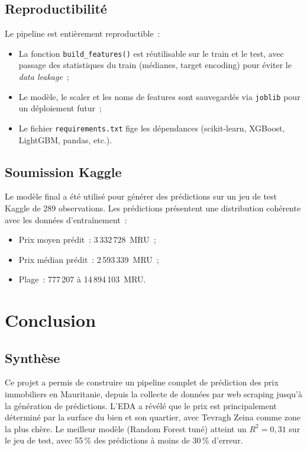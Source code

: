 \documentclass[12pt, a4paper]{article}
\begin{document}
\subsection{Reproductibilité}

Le pipeline est entièrement reproductible~:
\begin{itemize}
    \item La fonction \texttt{build\_features()} est réutilisable sur le train et le test, avec passage des statistiques du train (médianes, target encoding) pour éviter le \textit{data leakage}~;
    \item Le modèle, le scaler et les noms de features sont sauvegardés via \texttt{joblib} pour un déploiement futur~;
    \item Le fichier \texttt{requirements.txt} fige les dépendances (scikit-learn, XGBoost, LightGBM, pandas, etc.).
\end{itemize}

\subsection{Soumission Kaggle}

Le modèle final a été utilisé pour générer des prédictions sur un jeu de test Kaggle de 289 observations. Les prédictions présentent une distribution cohérente avec les données d'entraînement~:
\begin{itemize}
    \item Prix moyen prédit~: 3\,332\,728~MRU~;
    \item Prix médian prédit~: 2\,593\,339~MRU~;
    \item Plage~: 777\,207 à 14\,894\,103~MRU.
\end{itemize}

\section{Conclusion}

\subsection{Synthèse}

Ce projet a permis de construire un pipeline complet de prédiction des prix immobiliers en Mauritanie, depuis la collecte de données par web scraping jusqu'à la génération de prédictions. L'EDA a révélé que le prix est principalement déterminé par la surface du bien et son quartier, avec Tevragh Zeina comme zone la plus chère. Le meilleur modèle (Random Forest tuné) atteint un $R^2 = 0,31$ sur le jeu de test, avec 55\,\% des prédictions à moins de 30\,\% d'erreur.
\end{document}
